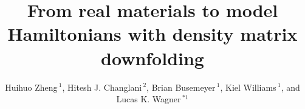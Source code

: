 \documentclass[utf8,latin9]{frontiersFPHY}
\renewcommand\abstractname{}
\def\firstAuthorLast{H. Zheng et al.} %
\def\Authors{Huihuo Zheng\,$^{1}$, Hitesh J. Changlani\,$^{2}$, Brian Busemeyer\,$^{1}$, Kiel Williams\,$^{1}$, and Lucas K. Wagner\,$^{*1}$}
\begin{document}
\onecolumn
{}

\title[Density matrix downfolding]{From real materials to model Hamiltonians with density matrix downfolding}
\author[\firstAuthorLast ]{\Authors} %
\address{} %
\correspondance{} %
\extraAuth{}
\maketitle
\end{document}
